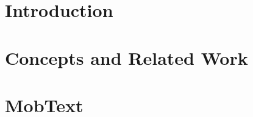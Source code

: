 \documentclass[Ingles,Final]{ic-tese-v3}
\begin{document}
\listoffigures

\listoftables





\tableofcontents


\fimdaspaginasiniciais


\chapter{Introduction}





\chapter{Concepts and Related Work}%
\label{chap:related-work}





\FloatBarrier
\newpage
\chapter{MobText}
\label{chap:proposed-method}
\end{document}
